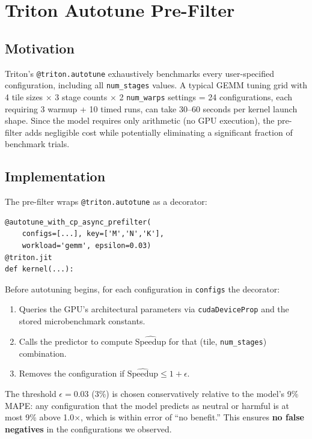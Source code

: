 \documentclass[sigplan,nonacm,10pt]{acmart}
\begin{document}
\section{Triton Autotune Pre-Filter}
\label{sec:triton}

\subsection{Motivation}

Triton's \texttt{@triton.autotune} exhaustively benchmarks every
user-specified configuration, including all \texttt{num\_stages} values.
A typical GEMM tuning grid with 4 tile sizes $\times$ 3 stage counts
$\times$ 2 \texttt{num\_warps} settings = 24 configurations, each
requiring 3 warmup + 10 timed runs, can take 30--60 seconds per kernel
launch shape.
Since the model requires only arithmetic (no GPU execution), the
pre-filter adds negligible cost while potentially eliminating a
significant fraction of benchmark trials.

\subsection{Implementation}

The pre-filter wraps \texttt{@triton.autotune} as a decorator:

\begin{verbatim}
@autotune_with_cp_async_prefilter(
    configs=[...], key=['M','N','K'],
    workload='gemm', epsilon=0.03)
@triton.jit
def kernel(...):
\end{verbatim}

Before autotuning begins, for each configuration in \texttt{configs}
the decorator:
\begin{enumerate}
\item Queries the GPU's architectural parameters via
  \texttt{cudaDeviceProp} and the stored microbenchmark constants.
\item Calls the predictor to compute $\widehat{\text{Speedup}}$ for
  that (tile, \texttt{num\_stages}) combination.
\item Removes the configuration if $\widehat{\text{Speedup}} \leq
  1 + \epsilon$.
\end{enumerate}

The threshold $\epsilon = 0.03$ (3\%) is chosen conservatively relative
to the model's 9\% MAPE: any configuration that the model predicts as
neutral or harmful is at most 9\% above 1.0$\times$, which is within
error of ``no benefit.'' This ensures \textbf{no false negatives} in
the configurations we observed.
\end{document}
